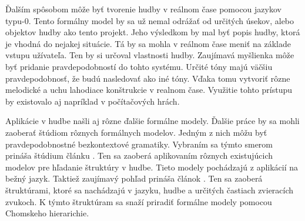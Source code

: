 Ďalším spôsobom môže byť tvorenie hudby v reálnom čase pomocou jazykov typu-0. Tento formálny model by sa už nemal odrážať od určitých úsekov, alebo objektov hudby ako tento projekt. Jeho výsledkom by mal byť popis hudby, ktorá je vhodná do nejakej situácie. Tá by sa mohla v reálnom čase meniť na základe vstupu užívateľa. Ten by si určoval vlastnosti hudby. Zaujímavá myšlienka môže byť pridanie pravdepodobností do tohto systému. Určité tóny majú väčšiu pravdepodobnosť, že budú nasledovať ako iné tóny. Vďaka tomu vytvoriť rôzne melodické a uchu lahodiace konštrukcie v realnom čase. Využitie tohto prístupu by existovalo aj napríklad v počítačových hrách. 

Aplikácie v hudbe našli aj rôzne ďalšie formálne modely. Ďalšie práce by sa mohli zaoberať štúdiom rôznych formálnych modelov. Jedným z nich môžu byť pravdepodobnostné bezkontextové gramatiky. Vybraním sa týmto smerom prináša štúdium článku \cite{gil:2022:Citace}. Ten sa zaoberá aplikovaním rôznych existujúcich modelov pre hľadanie štruktúry v hudbe. Tieto modely pochádzajú z aplikácií na bežný jazyk.  
Taktiež zaujímavý pohľad prináša článok \cite{wilanimal:2022:Citace}. Ten sa zaoberá štruktúrami, ktoré sa nachádzajú v jazyku, hudbe a určitých častiach zvieracích zvukoch. K týmto štruktúram sa snaží priradiť formálne modely pomocou Chomskeho hierarichie.



